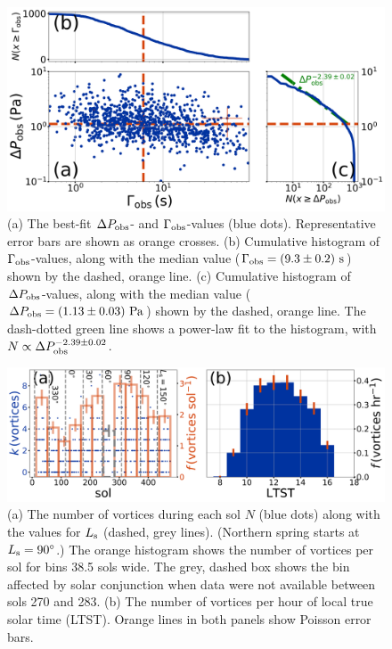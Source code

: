 \documentclass{aastex63}
\begin{document}
\begin{figure}
    \centering
    \includegraphics[width=\textwidth]{figures/DeltaPobs_vs_Gammaobs.png}
    \caption{(a) The best-fit $\Delta P_{\rm obs}$- and $\Gamma_{\rm obs}$-values (blue dots). Representative error bars are shown as orange crosses. (b) Cumulative histogram of $\Gamma_{\rm obs}$-values, along with the median value ($\Gamma_{\rm obs} = \left( 9.3 \pm 0.2 \right)\,{\rm s}$) shown by the dashed, orange line. (c) Cumulative histogram of $\Delta P_{\rm obs}$-values, along with the median value ($\Delta P_{\rm obs} = \left( 1.13 \pm 0.03 \right)\,{\rm Pa}$) shown by the dashed, orange line. The dash-dotted green line shows a power-law fit to the histogram, with $N \propto \Delta P_{\rm obs}^{-2.39\pm0.02}$.}
    \label{fig:DeltaPobs_vs_Gammaobs}
\end{figure}

\begin{figure}
    \centering
    \includegraphics[width=\textwidth]{figures/sol_and_t0_histograms.png}
    \caption{(a) The number of vortices during each sol $N$ (blue dots) along with the values for $L_{\rm s}$ (dashed, grey lines). (Northern spring starts at $L_{\rm s} = 90^\circ$.) The orange histogram shows the number of vortices per sol for bins 38.5 sols wide. The grey, dashed box shows the bin affected by solar conjunction when data were not available between sols 270 and 283. (b) The number of vortices per hour of local true solar time (LTST). Orange lines in both panels show Poisson error bars.}
    \label{fig:sol_and_t0_histograms}
\end{figure}
\end{document}
